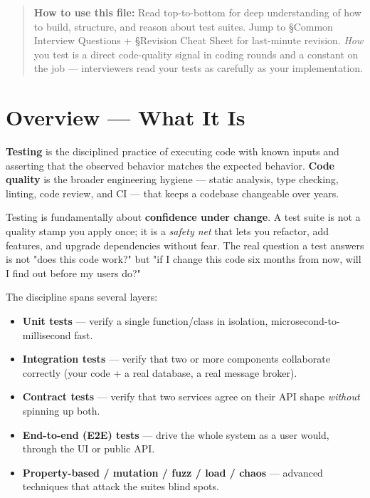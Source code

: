 \documentclass[11pt]{article}
\providecommand{\tightlist}{\setlength{\itemsep}{1pt}\setlength{\parskip}{0pt}}
\begin{document}
\makecoverpage

\thispagestyle{empty}
{\hypersetup{hidelinks}\tableofcontents}
\clearpage

\begin{quote}
\textbf{How to use this file:} Read top-to-bottom for deep understanding of how to build, structure, and reason about test suites. Jump to §Common Interview Questions + §Revision Cheat Sheet for last-minute revision. \emph{How} you test is a direct code-quality signal in coding rounds and a constant on the job --- interviewers read your tests as carefully as your implementation.
\end{quote}

\section{Overview --- What It Is}\label{overview--what-it-is}

\textbf{Testing} is the disciplined practice of executing code with known inputs and asserting that the observed behavior matches the expected behavior. \textbf{Code quality} is the broader engineering hygiene --- static analysis, type checking, linting, code review, and CI --- that keeps a codebase changeable over years.

Testing is fundamentally about \textbf{confidence under change}. A test suite is not a quality stamp you apply once; it is a \emph{safety net} that lets you refactor, add features, and upgrade dependencies without fear. The real question a test answers is not "does this code work?" but "if I change this code six months from now, will I find out before my users do?"

The discipline spans several layers:

\begin{itemize}
\tightlist
\item
  \textbf{Unit tests} --- verify a single function/class in isolation, microsecond-to-millisecond fast.
\item
  \textbf{Integration tests} --- verify that two or more components collaborate correctly (your code + a real database, a real message broker).
\item
  \textbf{Contract tests} --- verify that two services agree on their API shape \emph{without} spinning up both.
\item
  \textbf{End-to-end (E2E) tests} --- drive the whole system as a user would, through the UI or public API.
\item
  \textbf{Property-based / mutation / fuzz / load / chaos} --- advanced techniques that attack the suite\textquotesingle s blind spots.
\end{itemize}
\end{document}

